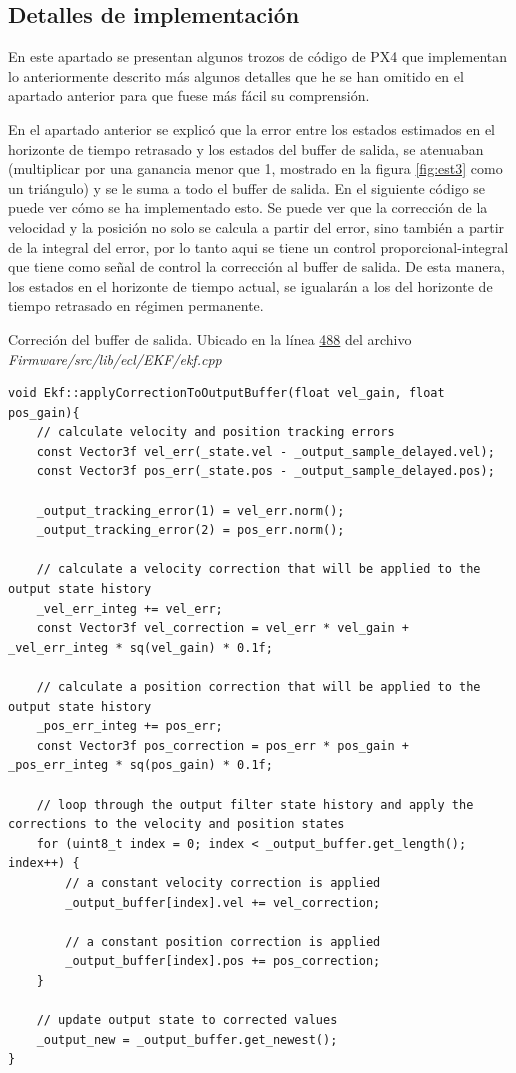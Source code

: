 



\subsection{Detalles de implementación}
En este apartado se presentan algunos trozos de código de PX4 que implementan lo anteriormente descrito más algunos detalles que he se han omitido en el apartado anterior para que fuese más fácil su comprensión.

En el apartado anterior se explicó que la error entre los estados estimados en el horizonte de tiempo retrasado y los estados del buffer de salida, se atenuaban (multiplicar por una ganancia menor que 1, mostrado en la figura \ref{fig:est3} como un triángulo) y se le suma a todo el buffer de salida. En el siguiente código se puede ver cómo se ha implementado esto. Se puede ver que la corrección de la velocidad y la posición no solo se calcula a partir del error, sino también a partir de la integral del error, por lo tanto aqui se tiene un control proporcional-integral que tiene como señal de control la corrección al buffer de salida. De esta manera, los estados en el horizonte de tiempo actual, se igualarán a los del horizonte de tiempo retrasado en régimen permanente. 

\begin{codigo}{Correción del buffer de salida. Ubicado en  la línea \href{https://github.com/PX4/PX4-ECL/blob/ec934908900b23ee273d1a9f82364b7b38423200/EKF/ekf.cpp\#L488}{488} del archivo \textit{Firmware/src/lib/ecl/EKF/ekf.cpp}}
\begin{verbatim}
void Ekf::applyCorrectionToOutputBuffer(float vel_gain, float pos_gain){
	// calculate velocity and position tracking errors
	const Vector3f vel_err(_state.vel - _output_sample_delayed.vel);
	const Vector3f pos_err(_state.pos - _output_sample_delayed.pos);

	_output_tracking_error(1) = vel_err.norm();
	_output_tracking_error(2) = pos_err.norm();

	// calculate a velocity correction that will be applied to the output state history
	_vel_err_integ += vel_err;
	const Vector3f vel_correction = vel_err * vel_gain + _vel_err_integ * sq(vel_gain) * 0.1f;

	// calculate a position correction that will be applied to the output state history
	_pos_err_integ += pos_err;
	const Vector3f pos_correction = pos_err * pos_gain + _pos_err_integ * sq(pos_gain) * 0.1f;

	// loop through the output filter state history and apply the corrections to the velocity and position states
	for (uint8_t index = 0; index < _output_buffer.get_length(); index++) {
		// a constant velocity correction is applied
		_output_buffer[index].vel += vel_correction;

		// a constant position correction is applied
		_output_buffer[index].pos += pos_correction;
	}

	// update output state to corrected values
	_output_new = _output_buffer.get_newest();
}
\end{verbatim}
\end{codigo} 

